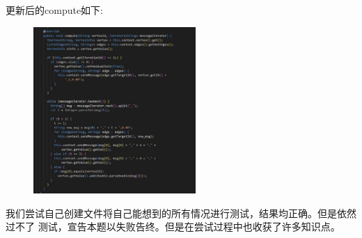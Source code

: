更新后的compute如下:
\newpage

\begin{figure}[H]
  \begin{center}
    \includegraphics[width=0.55\textwidth,scale=0.5]{./figures/pro3/8.png}
  \end{center}
\end{figure}

我们尝试自己创建文件将自己能想到的所有情况进行测试，结果均正确。但是依然过不了
测试，宣告本题以失败告终。但是在尝试过程中也收获了许多知识点。

